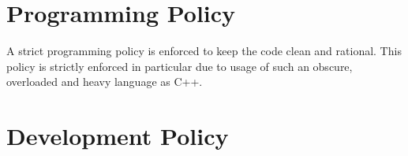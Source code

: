 \section{Programming Policy}\label{sec:programing-policy}

A strict programming policy is enforced to keep the code clean and
rational. This policy is strictly enforced in particular due to usage
of such an obscure, overloaded and heavy language as C++.

\section{Development Policy}


